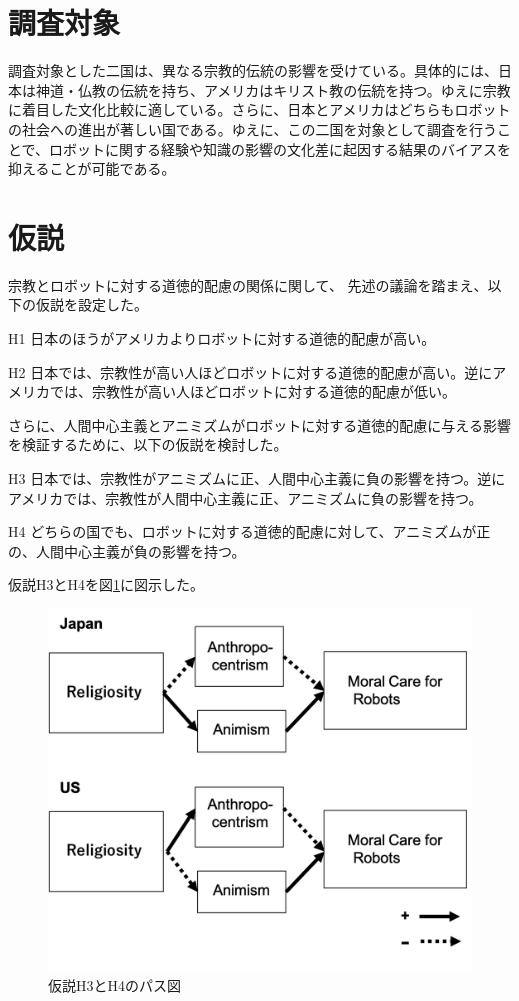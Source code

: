 \documentclass[a4j,12pt]{jreport}
\begin{document}
\section{調査対象}
調査対象とした二国は、異なる宗教的伝統の影響を受けている。具体的には、日本は神道・仏教の伝統を持ち、アメリカはキリスト教の伝統を持つ。ゆえに宗教に着目した文化比較に適している。さらに、日本とアメリカはどちらもロボットの社会への進出が著しい国である\cite{busi}。ゆえに、この二国を対象として調査を行うことで、ロボットに関する経験や知識の影響の文化差に起因する結果のバイアスを抑えることが可能である。

\section{仮説}
宗教とロボットに対する道徳的配慮の関係に関して、
先述の議論を踏まえ、以下の仮説を設定した。

\begin{description}
\item{H1} 日本のほうがアメリカよりロボットに対する道徳的配慮が高い。
\item{H2} 日本では、宗教性が高い人ほどロボットに対する道徳的配慮が高い。逆にアメリカでは、宗教性が高い人ほどロボットに対する道徳的配慮が低い。
\end{description}

さらに、人間中心主義とアニミズムがロボットに対する道徳的配慮に与える影響を検証するために、以下の仮説を検討した。

\begin{description}
\item{H3} 日本では、宗教性がアニミズムに正、人間中心主義に負の影響を持つ。逆にアメリカでは、宗教性が人間中心主義に正、アニミズムに負の影響を持つ。
\item{H4} どちらの国でも、ロボットに対する道徳的配慮に対して、アニミズムが正の、人間中心主義が負の影響を持つ。
\end{description}
仮説H3とH4を図\ref{hypot}に図示した。
\begin{figure}[H]
 \centering
 \includegraphics[keepaspectratio, width=15cm]{images/h2.png}
 \caption{仮説H3とH4のパス図}
 \label{hypot}
\end{figure}
\end{document}
